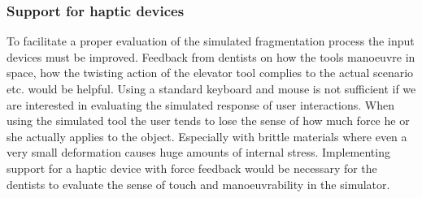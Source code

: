 \subsubsection*{Support for haptic devices}
To facilitate a proper evaluation of the simulated fragmentation
process the input devices must be improved. Feedback from dentists
on how the tools manoeuvre in space, how the twisting action of the
elevator tool complies to the actual scenario etc. would be helpful.
%
Using a standard keyboard and mouse is not sufficient if we are
interested in evaluating the simulated response of user interactions.
When using the simulated tool the user tends to lose
the sense of how much force he or she actually applies to the
object. Especially with brittle materials where even a very small
deformation causes huge amounts of internal stress. 
%
Implementing support for a haptic device with force feedback would be
necessary for the dentists to evaluate the sense of touch and
manoeuvrability in the simulator. 



